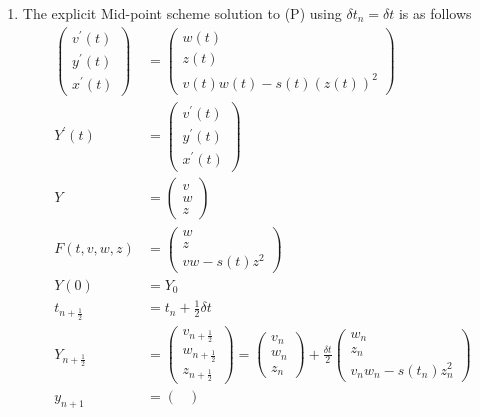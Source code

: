\documentclass[12pt,a4paper]{article}
\begin{document}
\begin{enumerate}
\item
The explicit Mid-point scheme solution to (P)  using $\delta t_n   =  \delta t$ is as follows
\begin{align*}
 \begin{pmatrix}
     v^\prime (t) \\
     y^\prime (t) \\
     x^\prime (t)
\end{pmatrix}   &=  \begin{pmatrix}
  w(t)  \\
  z(t) \\
  v(t) w(t)  -  s(t)  \left(  z(t) \right)^2
\end{pmatrix}\\
Y^\prime (t) &=   \begin{pmatrix}
     v^\prime (t) \\
     y^\prime (t) \\
     x^\prime (t)
\end{pmatrix} \\
Y &=  \begin{pmatrix}
    v\\
    w\\
    z
\end{pmatrix}\\
F(t,v,w,z)  &=  \begin{pmatrix}
w \\
z\\
vw  - s(t) z^2
\end{pmatrix}\\
Y(0)  &=  Y_0 \\
t_{n  + \frac{1}{2}}  &=  t_n  + \frac{1}{2}  \delta t\\
Y_{n  + \frac{1}{2}} &=  \begin{pmatrix}
   v_{n  + \frac{1}{2}}\\
   w_{n  + \frac{1}{2}}\\
   z_{n  + \frac{1}{2}} 
\end{pmatrix} = \begin{pmatrix}
     v_n \\
     w_n \\
     z_n
   \end{pmatrix}    + \frac{\delta t} {2}  \begin{pmatrix}
       w_n \\
       z_n \\
       v_n  w_n  -  s(t_n)  z_n^2
   \end{pmatrix}\\
   y_{n+1}  &=  \begin{pmatrix}

\end{pmatrix}
\end{align*}
\end{enumerate}
\end{document}
